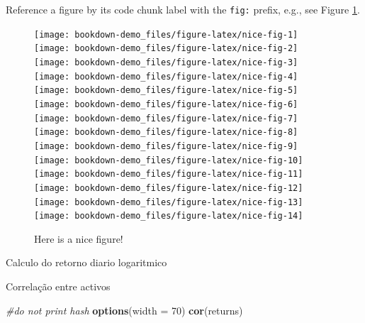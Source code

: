 \documentclass[
  12pt,
  a4paper,
  openany]{book}
\newenvironment{Shaded}{\begin{snugshade}}{\end{snugshade}}
\newcommand{\CommentTok}[1]{\textcolor[rgb]{0.56,0.35,0.01}{\textit{#1}}}
\newcommand{\DataTypeTok}[1]{\textcolor[rgb]{0.13,0.29,0.53}{#1}}
\newcommand{\DecValTok}[1]{\textcolor[rgb]{0.00,0.00,0.81}{#1}}
\newcommand{\KeywordTok}[1]{\textcolor[rgb]{0.13,0.29,0.53}{\textbf{#1}}}
\newcommand{\NormalTok}[1]{#1}
\begin{document}
\normalsize

Reference a figure by its code chunk label with the \texttt{fig:} prefix, e.g., see Figure \ref{fig:nice-fig}.
\scriptsize

\begin{figure}
\texttt{[image: bookdown-demo\_files/figure-latex/nice-fig-1]} \texttt{[image: bookdown-demo\_files/figure-latex/nice-fig-2]} \texttt{[image: bookdown-demo\_files/figure-latex/nice-fig-3]} \texttt{[image: bookdown-demo\_files/figure-latex/nice-fig-4]} \texttt{[image: bookdown-demo\_files/figure-latex/nice-fig-5]} \texttt{[image: bookdown-demo\_files/figure-latex/nice-fig-6]} \texttt{[image: bookdown-demo\_files/figure-latex/nice-fig-7]} \texttt{[image: bookdown-demo\_files/figure-latex/nice-fig-8]} \texttt{[image: bookdown-demo\_files/figure-latex/nice-fig-9]} \texttt{[image: bookdown-demo\_files/figure-latex/nice-fig-10]} \texttt{[image: bookdown-demo\_files/figure-latex/nice-fig-11]} \texttt{[image: bookdown-demo\_files/figure-latex/nice-fig-12]} \texttt{[image: bookdown-demo\_files/figure-latex/nice-fig-13]} \texttt{[image: bookdown-demo\_files/figure-latex/nice-fig-14]} \caption{Here is a nice figure!}\label{fig:nice-fig}
\end{figure}

Calculo do retorno diario logaritmico
\scriptsize

\normalsize

Correlação entre activos
\scriptsize

\begin{Shaded}
\begin{Highlighting}[]
\CommentTok{\#do not print hash}
\KeywordTok{options}\NormalTok{(}\DataTypeTok{width =} \DecValTok{70}\NormalTok{)}
\KeywordTok{cor}\NormalTok{(returns)}
\end{Highlighting}
\end{Shaded}
\end{document}
